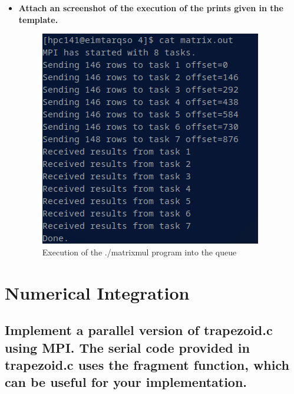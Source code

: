 \documentclass[11pt]{article}
\begin{document}
\begin{itemize}
    \item \textbf{Attach an screenshot of the execution of the prints given in the template.}
    \begin{figure}[h!]
        \centering
        \includegraphics[scale=0.7]{matrixmul_exec.png}
        \caption*{Execution of the ./matrixmul program into the queue}
        \label{fig:4.1}
    \end{figure}
\end{itemize}

\hypertarget{5}{%
\section{Numerical Integration}\label{5}}

\subsection*{Implement a parallel version of trapezoid.c using MPI. The serial code provided in trapezoid.c uses the fragment function, which can be useful for your implementation.}
\end{document}
